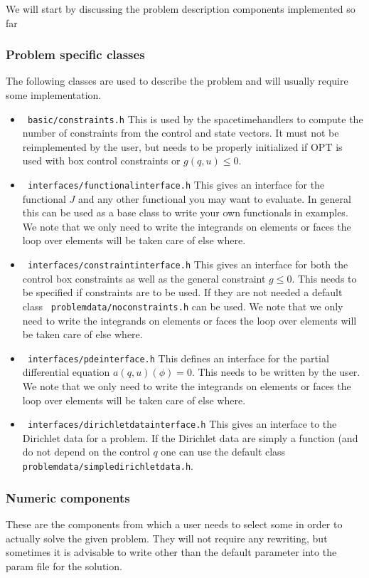 We will start by discussing the problem description components implemented so far

\subsubsection{Problem specific classes}
The following classes are used to describe the problem and will usually require 
some implementation.

\begin{itemize}
  \item \texttt{ basic/constraints.h} This is used by the spacetimehandlers to 
    compute the number of constraints from the control and state vectors. 
    It must not be reimplemented by the user, but needs to be properly 
    initialized if OPT is used with box control constraints or $g(q,u) \le 0$.
  \item \texttt{ interfaces/functionalinterface.h} This gives an interface 
    for the functional $J$ and any other functional you may want to evaluate.
    In general this can be used as a base class to write your own functionals 
    in examples. We note that we only need to write the integrands on 
    elements or faces the loop over elements will be taken care of else where.
  \item \texttt{ interfaces/constraintinterface.h} This gives an interface for both 
    the control box constraints as well as the general constraint $g \le 0$. This 
    needs to be specified if constraints are to be used. If they are not needed 
    a default class \texttt{ problemdata/noconstraints.h} can be used. We note that we only 
    need to write the integrands on 
    elements or faces the loop over elements will be taken care of else where.
  \item \texttt{ interfaces/pdeinterface.h} This defines an interface for the 
    partial differential equation $a(q,u)(\phi) = 0$. This needs to be written
    by the user. We note that we only need to write the integrands on 
    elements or faces the loop over elements will be taken care of else where.
  \item \texttt{ interfaces/dirichletdatainterface.h} This gives an interface to the 
    Dirichlet data for a problem. If the Dirichlet data are simply a function 
    (and do not depend on the control $q$ one can use the default class
    \texttt{ problemdata/simpledirichletdata.h}.
\end{itemize}

\subsubsection{Numeric components}
These are the components from which a user needs to select some in order to actually 
solve the given problem. They will not require any rewriting, but sometimes it is 
advisable to write other than the default parameter into the param file for the 
solution.

